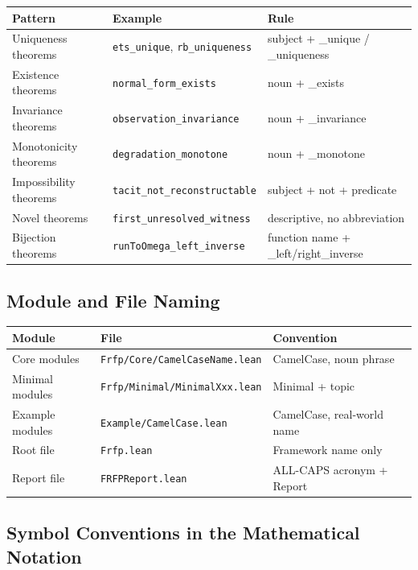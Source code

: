 \begin{center}
\begin{tabular}{lll}
\toprule
Pattern & Example & Rule \\
\midrule
Uniqueness theorems & \texttt{ets\_unique}, \texttt{rb\_uniqueness} & subject + \_unique / \_uniqueness \\
Existence theorems & \texttt{normal\_form\_exists} & noun + \_exists \\
Invariance theorems & \texttt{observation\_invariance} & noun + \_invariance \\
Monotonicity theorems & \texttt{degradation\_monotone} & noun + \_monotone \\
Impossibility theorems & \texttt{tacit\_not\_reconstructable} & subject + not + predicate \\
Novel theorems & \texttt{first\_unresolved\_witness} & descriptive, no abbreviation \\
Bijection theorems & \texttt{runToOmega\_left\_inverse} & function name + \_left/right\_inverse \\
\bottomrule
\end{tabular}
\end{center}

\subsection*{Module and File Naming}

\begin{center}
\begin{tabular}{lll}
\toprule
Module & File & Convention \\
\midrule
Core modules & \texttt{Frfp/Core/CamelCaseName.lean} & CamelCase, noun phrase \\
Minimal modules & \texttt{Frfp/Minimal/MinimalXxx.lean} & Minimal + topic \\
Example modules & \texttt{Example/CamelCase.lean} & CamelCase, real-world name \\
Root file & \texttt{Frfp.lean} & Framework name only \\
Report file & \texttt{FRFPReport.lean} & ALL-CAPS acronym + Report \\
\bottomrule
\end{tabular}
\end{center}

\subsection*{Symbol Conventions in the Mathematical Notation}

